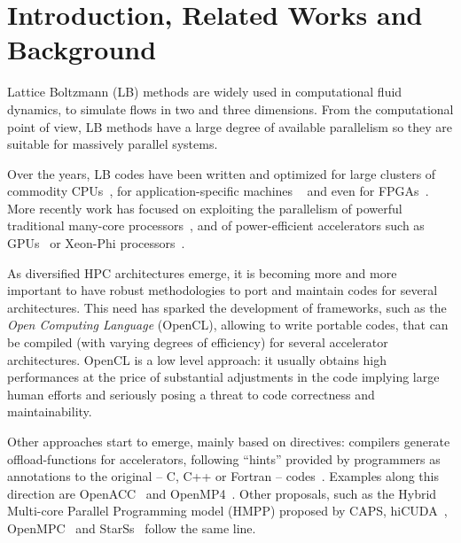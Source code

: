 \documentclass[times]{cpeauth}
\begin{document}


\maketitle


\section{Introduction, Related Works and Background}

Lattice Boltzmann (LB) methods are widely used in computational fluid 
dynamics, to simulate flows in two and three dimensions. 
%
From the computational point of view, LB methods have a large degree of
available parallelism so they are suitable for massively parallel systems. 

Over the years, LB codes have been written and optimized for large clusters 
of commodity CPUs~\cite{Pohl2004}, for application-specific machines
~\cite{cimento09,iccs10,ppam13} and even for FPGAs~\cite{lbm-fpga}.
%
More recently work has focused on exploiting the parallelism of powerful 
traditional many-core processors~\cite{iccs11}, and of power-efficient 
accelerators such as GPUs~\cite{ppam11,lbm-gpu2} or Xeon-Phi processors~\cite{iccs13}.
  
As diversified HPC architectures emerge, it is becoming more and more important
to have robust methodologies to port and maintain codes for several
architectures. This need has sparked the development of frameworks, such as the
{\em Open Computing Language} (OpenCL), allowing to write portable codes, 
that can be compiled (with varying degrees of efficiency) for 
several accelerator architectures.
%
OpenCL is a low level approach: it usually obtains high performances at the 
price of substantial adjustments in the code implying large human efforts and 
seriously posing a threat to code correctness and maintainability.

Other approaches start to emerge, mainly based on directives: compilers
generate offload-functions for accelerators, following ``hints'' provided by
programmers as  annotations to the original -- C, C++ or Fortran -- codes~\cite{first-exp}.
%
Examples along this direction are OpenACC~\cite{openacc} and 
OpenMP4~\cite{openmp4}.
%
Other proposals, such as the Hybrid Multi-core Parallel Programming 
model (HMPP) proposed by CAPS, hiCUDA~\cite{hicuda}, OpenMPC~\cite{openmpc} 
and StarSs~\cite{starss} follow the same line.
\end{document}
